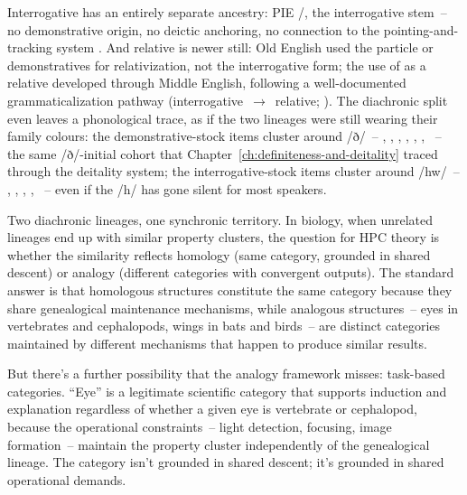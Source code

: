 Interrogative  has an entirely separate ancestry: PIE /, the interrogative stem~-- no demonstrative origin, no deictic anchoring, no connection to the pointing-and-tracking system \citep{fortson2004}. And relative  is newer still: Old English used the particle  or demonstratives for relativization, not the interrogative form; the use of  as a relative developed through Middle English, following a well-documented grammaticalization pathway (interrogative~$\rightarrow$~relative; \citealt{hopper1993}). The diachronic split even leaves a phonological trace, as if the two lineages were still wearing their family colours: the demonstrative-stock items cluster around /ð/~-- , , , , , , ~-- the same /ð/-initial cohort that Chapter~\ref{ch:definiteness-and-deitality} traced through the deitality system; the interrogative-stock items cluster around /hw/~-- , , , , ~-- even if the /h/ has gone silent for most speakers.

Two diachronic lineages, one synchronic territory. In biology, when unrelated lineages end up with similar property clusters, the question for HPC theory is whether the similarity reflects homology (same category, grounded in shared descent) or analogy (different categories with convergent outputs). The standard answer is that homologous structures constitute the same category because they share genealogical maintenance mechanisms, while analogous structures~-- eyes in vertebrates and cephalopods, wings in bats and birds~-- are distinct categories maintained by different mechanisms that happen to produce similar results.

But there's a further possibility that the analogy framework misses: task-based categories. \enquote{Eye} is a legitimate scientific category that supports induction and explanation regardless of whether a given eye is vertebrate or cephalopod, because the operational constraints~-- light detection, focusing, image formation~-- maintain the property cluster independently of the genealogical lineage. The category isn't grounded in shared descent; it's grounded in shared operational demands.

